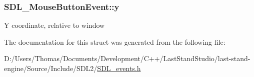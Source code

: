 \subsubsection[{y}]{ S\+D\+L\+\_\+\+Mouse\+Button\+Event\+::y}\label{structSDL__MouseButtonEvent_a7ccb5c55a7ddadce723f4ea6d5269540}
Y coordinate, relative to window 

The documentation for this struct was generated from the following file\+:\begin{DoxyCompactItemize}
\item 
D\+:/\+Users/\+Thomas/\+Documents/\+Development/\+C++/\+Last\+Stand\+Studio/last-\/stand-\/engine/\+Source/\+Include/\+S\+D\+L2/\hyperlink{SDL__events_8h}{S\+D\+L\+\_\+events.\+h}\end{DoxyCompactItemize}
